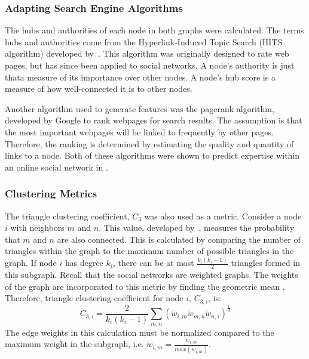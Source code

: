 \documentclass[12pt]{report}
\begin{document}
\subsubsection{Adapting Search Engine Algorithms}

The hubs and authorities of each node in both graphs were calculated.
The terms hubs and authorities come from the Hyperlink-Induced Topic Search (HITS algorithm) developed by~\cite{kleinberg_hubs_1999}.
This algorithm was originally designed to rate web pages, but has since been applied to social networks.
A node's authority is just that\textemdash{}a measure of its importance over other nodes.
A node's hub score is a measure of how well-connected it is to other nodes.

Another algorithm used to generate features was the pagerank algorithm, developed by Google \cite{page_pagerank_1999} to rank webpages for search results.
The assumption is that the most important webpages will be linked to frequently by other pages.
Therefore, the ranking is determined by estimating the quality and quantity of links to a node.
Both of these algorithms were shown to predict expertise within an online social network in \cite{zhang_expertise_2007}.

\subsubsection{Clustering Metrics}
The triangle clustering coefficient, $C_3$ was also used as a metric.
Consider a node $i$ with neighbors $m$ and $n$.
This value, developed by~\cite{saramaki_generalizations_2007}, measures the probability that $m$ and $n$ are also connected.
This is calculated by comparing the number of triangles within the graph to the maximum number of possible triangles in the graph.  If node $i$ has degree $k_i$, there can be at most $\frac{k_i(k_i-1)}{2}$ triangles formed in this subgraph.  Recall that the social networks are weighted graphs.  The weights of the graph are incorporated to this metric by finding the geometric mean \cite{zhang_expertise_2007}.   Therefore, triangle clustering coefficient for node $i$, $C_{3,i}$, is:
\begin{equation}
C_{3,i} = \frac{2}{k_i(k_i-1)}\sum_{m,n}(\tilde{w}_{i,m}\tilde{w}_{m,n}\tilde{w}_{n,i})^\frac{1}{3}
\end{equation}
The edge weights in this calculation must be normalized compared to the maximum weight in the subgraph, i.e. $\tilde{w}_{i,m} = \frac{w_{i,m}}{max(w_{i,m})}$.
\end{document}
